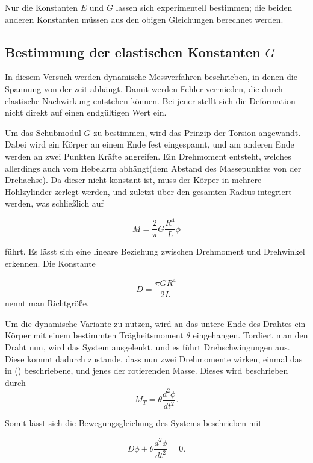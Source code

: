 Nur die Konstanten $E$ und $G$ lassen sich experimentell bestimmen; die beiden anderen Konstanten 
müssen aus den obigen Gleichungen berechnet werden. 


\subsection{Bestimmung der elastischen Konstanten $G$}

In diesem Versuch werden dynamische Messverfahren beschrieben, in denen die Spannung von der zeit abhängt.
Damit werden Fehler vermieden, die durch elastische Nachwirkung entstehen können. Bei jener stellt sich die Deformation nicht direkt auf einen endgültigen Wert ein.

Um das Schubmodul $G$ zu bestimmen, wird das Prinzip der Torsion angewandt.
Dabei wird ein Körper an einem Ende fest eingespannt, und am anderen Ende werden an zwei Punkten Kräfte angreifen.
Ein Drehmoment entsteht, welches allerdings auch vom Hebelarm abhängt(dem Abstand des Massepunktes von der Drehachse).
Da dieser nicht konstant ist, muss der Körper in mehrere Hohlzylinder zerlegt werden, und zuletzt über den gesamten Radius integriert werden, was  schließlich auf

\begin{equation}
  M = \frac{2}{\pi}G\frac{R^{4}}{L}\phi
\end{equation}

führt. Es lässt sich eine lineare Beziehung zwischen Drehmoment und Drehwinkel erkennen.
Die Konstante 

\begin{equation}
  D = \frac{\pi G R^{4}}{2L}
\end{equation}
nennt man Richtgröße.

Um die dynamische Variante zu nutzen, wird an das untere Ende des Drahtes ein Körper mit einem bestimmten Trägheitsmoment $\theta$
eingehangen. Tordiert man den Draht nun, wird das System ausgelenkt, und es führt Drehschwingungen aus.
Diese kommt dadurch zustande, dass nun zwei Drehmomente wirken, einmal das in () beschriebene, und jenes der rotierenden Masse.
Dieses wird beschrieben durch
\begin{equation}
  M_T = \theta \frac{d^{2}\phi}{dt^{2}} .
\end{equation}

Somit lässt sich die Bewegungsgleichung des Systems beschrieben mit

\begin{equation}
  D\phi + \theta \frac{d^{2}\phi}{dt^{2}} = 0 .
\end{equation}

